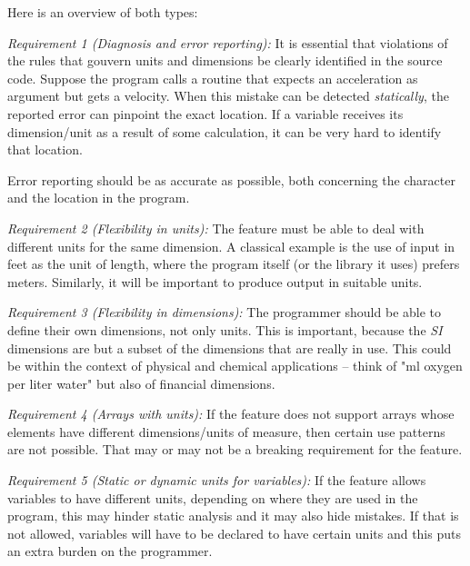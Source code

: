 \documentclass{article}
\begin{document}
Here is an overview of both types:

\vspace{\baselineskip}
\noindent \emph{Requirement 1 (Diagnosis and error reporting):}
It is essential that violations of the rules that gouvern units and dimensions be clearly identified in the
source code. Suppose the program calls a routine that expects an acceleration as argument but gets a velocity.
When this mistake can be detected \emph{statically}, the reported error can pinpoint the exact location. If
a variable receives its dimension/unit as a result of some calculation, it can be very hard to identify that
location.

Error reporting should be as accurate as possible, both concerning the character and the location in the program.

\vspace{\baselineskip}
\noindent \emph{Requirement 2 (Flexibility in units):}
The feature must be able to deal with different units for the same dimension. A classical example is the use of
input in feet as the unit of length, where the program itself (or the library it uses) prefers meters. Similarly,
it will be important to produce output in suitable units.

\vspace{\baselineskip}
\noindent \emph{Requirement 3 (Flexibility in dimensions):}
The programmer should be able to define their own dimensions, not only units. This is important, because the \emph{SI}
dimensions are but a subset of the dimensions that are really in use. This could be within the context of
physical and chemical applications -- think of "ml oxygen per liter water" but also of financial dimensions.

\vspace{\baselineskip}
\noindent \emph{Requirement 4 (Arrays with units):}
If the feature does not support arrays whose elements have different dimensions/units of measure, then
certain use patterns are not possible. That may or may not be a breaking requirement for the feature.

\vspace{\baselineskip}
\noindent \emph{Requirement 5 (Static or dynamic units for variables):}
If the feature allows variables to have different units, depending on where they are used in the program, this
may hinder static analysis and it may also hide mistakes. If that is not allowed, variables will have to be
declared to have certain units and this puts an extra burden on the programmer.
\end{document}
